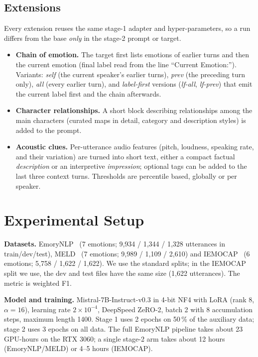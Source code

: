 \documentclass[lettersize,journal]{IEEEtran}
\begin{document}
\subsection{Extensions}
Every extension reuses the same stage-1 adapter and hyper-parameters, so a run differs from the base \emph{only} in the stage-2 prompt or target.
\begin{itemize}
\item \textbf{Chain of emotion.} The target first lists emotions of earlier turns and then the current emotion (final label read from the line ``Current Emotion:''). Variants: \emph{self} (the current speaker's earlier turns), \emph{prev} (the preceding turn only), \emph{all} (every earlier turn), and \emph{label-first} versions (\emph{lf-all}, \emph{lf-prev}) that emit the current label first and the chain afterwards.
\item \textbf{Character relationships.} A short block describing relationships among the main characters (curated maps in detail, category and description styles) is added to the prompt.
\item \textbf{Acoustic clues.} Per-utterance audio features (pitch, loudness, speaking rate, and their variation) are turned into short text, either a compact factual \emph{description} or an interpretive \emph{impression}; optional tags can be added to the last three context turns. Thresholds are percentile based, globally or per speaker.
\end{itemize}

\section{Experimental Setup}\label{sec:setup}
\textbf{Datasets.} EmoryNLP~\cite{emorynlp2018} (7 emotions; 9{,}934 / 1{,}344 / 1{,}328 utterances in train/dev/test), MELD~\cite{meld2019} (7 emotions; 9{,}989 / 1{,}109 / 2{,}610) and IEMOCAP~\cite{iemocap2008} (6 emotions; 5{,}758 / 1{,}622 / 1{,}622). We use the standard splits; in the IEMOCAP split we use, the dev and test files have the same size (1{,}622 utterances). The metric is weighted F1.

\textbf{Model and training.} Mistral-7B-Instruct-v0.3 in 4-bit NF4 with LoRA (rank 8, $\alpha=16$), learning rate $2\times10^{-4}$, DeepSpeed ZeRO-2, batch 2 with 8 accumulation steps, maximum length 1400. Stage 1 uses 2 epochs on 50\,\% of the auxiliary data; stage 2 uses 3 epochs on all data. The full EmoryNLP pipeline takes about 23\,GPU-hours on the RTX 3060; a single stage-2 arm takes about 12 hours (EmoryNLP/MELD) or 4--5 hours (IEMOCAP).
\end{document}
